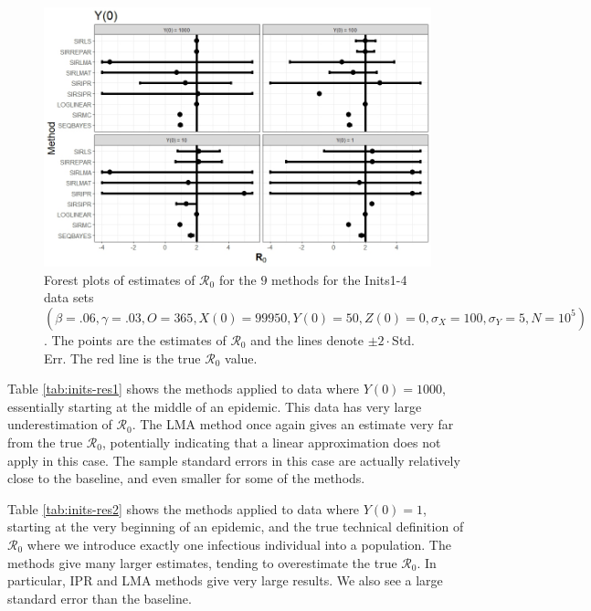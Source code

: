 \documentclass[12pt]{article}
\newcommand{\xxsir}{\ensuremath{9} } %
\newcommand{\rr}{\ensuremath{\mathcal{R}_0}}
\begin{document}
\begin{figure}[H]
  \centering
  \includegraphics[scale=0.5]{images/start.jpeg}
    \caption{Forest plots of estimates of $\rr$ for the \xxsir methods for the Inits1-4 data sets $(\beta=.06, \gamma=.03, O=365, X(0)=99950, Y(0)=50, Z(0)=0, \sigma_X=100, \sigma_Y=5, N=10^5)$.  The points are the estimates of $\rr$ and the lines denote $\pm 2\cdot $Std. Err.  The red line is the true $\rr$ value.}\label{fig:inits-res}
  \end{figure}

  Table \ref{tab:inits-res1} shows the methods applied to data where $Y(0) = 1000$, essentially starting at the middle of an epidemic. This data has very large underestimation of $\rr$. The LMA method once again gives an estimate very far from the true $\rr$, potentially indicating that a linear approximation does not apply in this case. The sample standard errors in this case are actually relatively close to the baseline, and even smaller for some of the methods.

Table \ref{tab:inits-res2} shows the methods applied to data where $Y(0) = 1$, starting at the very beginning of an epidemic, and the true technical definition of $\rr$ where we introduce exactly one infectious individual into a population. The methods give many larger estimates, tending to overestimate the true $\rr$. In particular, IPR and LMA methods give very large results. We also see a large standard error than the baseline.
\end{document}
